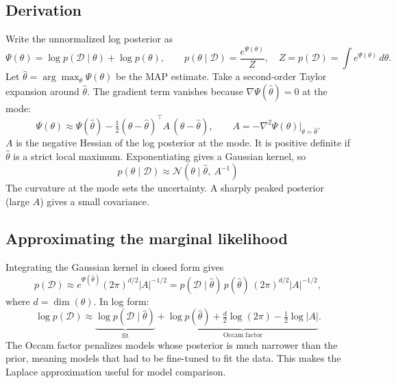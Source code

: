\documentclass[11pt]{article}
\begin{document}
\subsection{Derivation}
Write the unnormalized log posterior as
\begin{equation}
    \Psi(\theta) = \log p(\mathcal{D} \mid \theta) + \log p(\theta), \qquad p(\theta \mid \mathcal{D}) = \frac{e^{\Psi(\theta)}}{Z}, \quad Z = p(\mathcal{D}) = \int e^{\Psi(\theta)}\, d\theta .
\end{equation}
Let $\hat\theta = \arg\max_\theta \Psi(\theta)$ be the MAP estimate. Take a second-order Taylor expansion around $\hat\theta$. The gradient term vanishes because $\nabla \Psi(\hat\theta) = 0$ at the mode:
\begin{equation}
    \Psi(\theta) \approx \Psi(\hat\theta) - \tfrac{1}{2} (\theta - \hat\theta)^\top A\, (\theta - \hat\theta),
    \qquad A = -\nabla^2 \Psi(\theta)\big|_{\theta = \hat\theta}.
\end{equation}
$A$ is the negative Hessian of the log posterior at the mode. It is positive definite if $\hat\theta$ is a strict local maximum. Exponentiating gives a Gaussian kernel, so
\begin{equation}
    \boxed{\; p(\theta \mid \mathcal{D}) \approx \mathcal{N}\!\left(\theta \mid \hat\theta,\ A^{-1}\right) \;}
\end{equation}
The curvature at the mode sets the uncertainty. A sharply peaked posterior (large $A$) gives a small covariance.

\subsection{Approximating the marginal likelihood}
Integrating the Gaussian kernel in closed form gives
\begin{equation}
    p(\mathcal{D}) \approx e^{\Psi(\hat\theta)} (2\pi)^{d/2} |A|^{-1/2}
    = p(\mathcal{D} \mid \hat\theta)\, p(\hat\theta)\, (2\pi)^{d/2} |A|^{-1/2},
\end{equation}
where $d = \dim(\theta)$. In log form:
\begin{equation}
    \log p(\mathcal{D}) \approx \underbrace{\log p(\mathcal{D} \mid \hat\theta)}_{\text{fit}} + \underbrace{\log p(\hat\theta) + \tfrac{d}{2}\log(2\pi) - \tfrac{1}{2}\log|A|}_{\text{Occam factor}} .
\end{equation}
The Occam factor penalizes models whose posterior is much narrower than the prior, meaning models that had to be fine-tuned to fit the data. This makes the Laplace approximation useful for model comparison.
\end{document}
